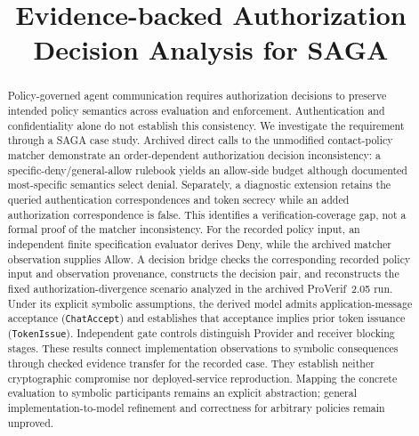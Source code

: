 \documentclass[11pt]{article}
\title{Evidence-backed Authorization Decision Analysis for SAGA}
\author{}
\date{}
\begin{document}
\maketitle

\begin{abstract}
Policy-governed agent communication requires authorization decisions to
preserve intended policy semantics across evaluation and enforcement.
Authentication and confidentiality alone do not establish this consistency.
We investigate the requirement through a SAGA case study. Archived direct
calls to the unmodified contact-policy matcher demonstrate an order-dependent
authorization decision inconsistency: a specific-deny/general-allow rulebook
yields an allow-side budget although documented most-specific semantics
select denial. Separately, a diagnostic extension retains the queried
authentication correspondences and token secrecy while an added authorization
correspondence is false. This identifies a verification-coverage gap, not a
formal proof of the matcher inconsistency.
For the recorded policy input, an independent finite specification evaluator
derives Deny, while the archived matcher observation supplies Allow. A
decision bridge checks the corresponding recorded policy input and observation
provenance, constructs the decision pair, and reconstructs the fixed
authorization-divergence scenario analyzed in the archived ProVerif~2.05 run.
Under its explicit symbolic assumptions, the derived model admits
application-message acceptance (\texttt{ChatAccept}) and establishes that
acceptance implies prior token issuance (\texttt{TokenIssue}). Independent
gate controls distinguish Provider and receiver blocking stages. These
results connect implementation observations to symbolic consequences through
checked evidence transfer for the recorded case. They establish neither
cryptographic compromise nor deployed-service reproduction. Mapping the
concrete evaluation to symbolic participants remains an explicit abstraction;
general implementation-to-model refinement and correctness for arbitrary
policies remain unproved.
\end{abstract}


\clearpage %

\clearpage

\clearpage

\clearpage

\clearpage

\clearpage

\clearpage

\clearpage

\clearpage


\clearpage


\end{document}
